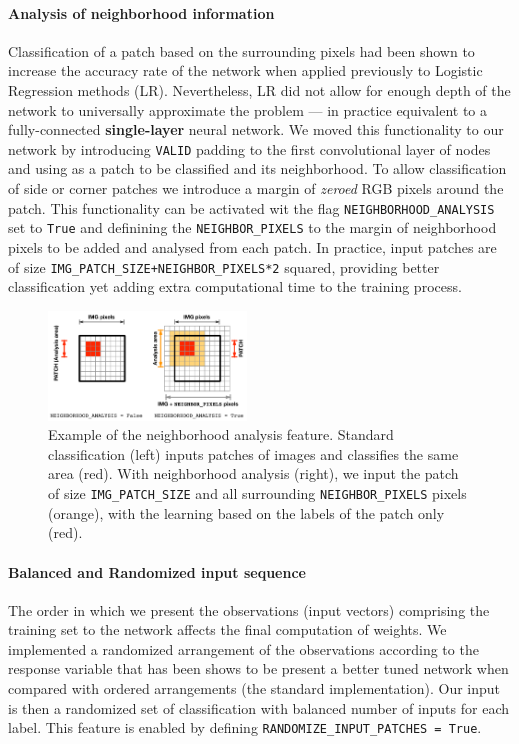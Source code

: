 \documentclass[fleqn,9 pt]{SelfArx} %
\begin{document}
\begin{sloppypar}
\paragraph{Analysis of neighborhood information} Classification of a patch based on the surrounding pixels had been shown to increase the accuracy rate of the network when applied previously to Logistic Regression methods (LR). Nevertheless, LR did not allow for enough depth of the network to universally approximate the problem --- in practice equivalent to a fully-connected \textbf{single-layer} neural network. We moved this functionality to our network by introducing \texttt{VALID} padding to the first convolutional layer of nodes and using as a patch to be classified and its neighborhood. To allow classification of side or corner patches we introduce a margin of \textit{zeroed} RGB pixels around the patch. This functionality can be activated wit the flag \texttt{NEIGHBORHOOD\_ANALYSIS} set to \texttt{True} and definining the \texttt{NEIGHBOR\_PIXELS} to the margin of neighborhood pixels to be added and analysed from each patch. In practice, input patches are of size \texttt{IMG\_PATCH\_SIZE+NEIGHBOR\_PIXELS*2} squared, providing better classification yet adding extra computational time to the training process.

\begin{figure}[H]
\centering
\includegraphics[width=0.47\textwidth]{figures/NEIGHBORHOOD_ANALYSIS.pdf}
\caption{Example of the neighborhood analysis feature. Standard classification (left) inputs patches of images and classifies the same area (red). With neighborhood analysis (right), we input the patch of size \texttt{IMG\_PATCH\_SIZE} and all surrounding \texttt{NEIGHBOR\_PIXELS} pixels (orange), with the learning based on the labels of the patch only (red).}
\end{figure}

\paragraph{Balanced and Randomized input sequence}

The order in which we present the observations (input vectors) comprising the training set to the network affects the final computation of weights. We implemented a randomized arrangement of the observations according to the response variable that has been shows to be present a better tuned network when compared with ordered arrangements (the standard implementation). Our input is then a randomized set of classification with balanced number of inputs for each label. This feature is enabled by defining \texttt{RANDOMIZE\_INPUT\_PATCHES = True}.


\end{sloppypar}
\end{document}
